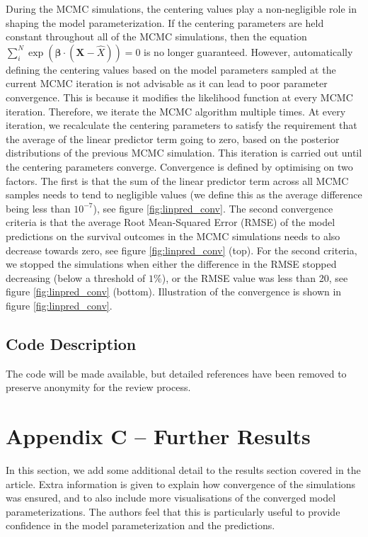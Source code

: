 \documentclass[
]{article}
\begin{document}
During the MCMC simulations, the centering values play a non-negligible role in shaping the model parameterization. If the centering parameters are held constant throughout all of the MCMC simulations, then the equation \(\sum_i^N \exp{(\boldsymbol{\beta}\cdot(\boldsymbol{X}-\hat{X}))}=0\) is no longer guaranteed. However, automatically defining the centering values based on the model parameters sampled at the current MCMC iteration is not advisable as it can lead to poor parameter convergence. This is because it modifies the likelihood function at every MCMC iteration. Therefore, we iterate the MCMC algorithm multiple times. At every iteration, we recalculate the centering parameters to satisfy the requirement that the average of the linear predictor term going to zero, based on the posterior distributions of the previous MCMC simulation. This iteration is carried out until the centering parameters converge. Convergence is defined by optimising on two factors. The first is that the sum of the linear predictor term across all MCMC samples needs to tend to negligible values (we define this as the average difference being less than \(10^{-7}\)), see figure \ref{fig:linpred_conv}. The second convergence criteria is that the average Root Mean-Squared Error (RMSE) of the model predictions on the survival outcomes in the MCMC simulations needs to also decrease towards zero, see figure \ref{fig:linpred_conv} (top). For the second criteria, we stopped the simulations when either the difference in the RMSE stopped decreasing (below a threshold of \(1\%\)), or the RMSE value was less than 20, see figure \ref{fig:linpred_conv} (bottom). Illustration of the convergence is shown in figure \ref{fig:linpred_conv}.

\newpage

\hypertarget{code-description}{%
\subsection{Code Description}\label{code-description}}

The code will be made available, but detailed references have been removed to preserve anonymity for the review process.

\hypertarget{appendix-c-further-results}{%
\section{Appendix C -- Further Results}\label{appendix-c-further-results}}

In this section, we add some additional detail to the results section covered in the article. Extra information is given to explain how convergence of the simulations was ensured, and to also include more visualisations of the converged model parameterizations. The authors feel that this is particularly useful to provide confidence in the model parameterization and the predictions.
\end{document}
